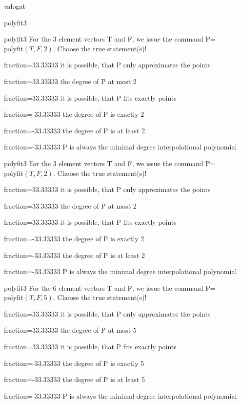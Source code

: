 \documentclass[12pt]{article}
\begin{document}
\begin{quiz}{valogat}
\begin{multi}[single=false]{polyfit3}
\end{multi}
\begin{multi}[single=false]{polyfit3}
For the $3$ element vectors T and F, we issue the command P=$\mathrm{polyfit}(T,F,2)$.
Choose the true statement(s)!
\item[fraction=33.33333] it is possible, that P only approximates the points
\item[fraction=33.33333] the degree of P at most 2
\item[fraction=33.33333] it is possible, that P fits exactly points
\item[fraction=-33.33333]  the degree of P is exactly 2
\item[fraction=-33.33333]  the degree of P is at least 2
\item[fraction=-33.33333]  P is always the minimal degree interpolational polynomial
\end{multi}
\begin{multi}[single=false]{polyfit3}
For the $3$ element vectors T and F, we issue the command P=$\mathrm{polyfit}(T,F,2)$.
Choose the true statement(s)!
\item[fraction=33.33333] it is possible, that P only approximates the points
\item[fraction=33.33333] the degree of P at most 2
\item[fraction=33.33333] it is possible, that P fits exactly points
\item[fraction=-33.33333]  the degree of P is exactly 2
\item[fraction=-33.33333]  the degree of P is at least 2
\item[fraction=-33.33333]  P is always the minimal degree interpolational polynomial
\end{multi}
\begin{multi}[single=false]{polyfit3}
For the $6$ element vectors T and F, we issue the command P=$\mathrm{polyfit}(T,F,5)$.
Choose the true statement(s)!
\item[fraction=33.33333] it is possible, that P only approximates the points
\item[fraction=33.33333] the degree of P at most 5
\item[fraction=33.33333] it is possible, that P fits exactly points
\item[fraction=-33.33333]  the degree of P is exactly 5
\item[fraction=-33.33333]  the degree of P is at least 5
\item[fraction=-33.33333]  P is always the minimal degree interpolational polynomial

\end{multi}
\end{quiz}
\end{document}
